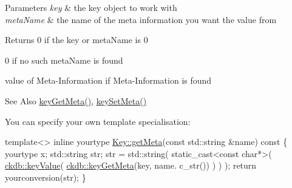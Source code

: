 \begin{DoxyParams}{Parameters}
{\em key} & the key object to work with \\
\hline
{\em meta\-Name} & the name of the meta information you want the value from \\
\hline
\end{DoxyParams}
\begin{DoxyReturn}{Returns}
0 if the key or meta\-Name is 0 

0 if no such meta\-Name is found 

value of Meta-\/\-Information if Meta-\/\-Information is found 
\end{DoxyReturn}
\begin{DoxySeeAlso}{See Also}
\hyperlink{group__keymeta_ga9ed3875495ddb3d8a8d29158a60a147c}{key\-Get\-Meta()}, \hyperlink{group__keymeta_gae1f15546b234ffb6007d8a31178652b9}{key\-Set\-Meta()} 
\end{DoxySeeAlso}


You can specify your own template specialisation\-: 
\begin{DoxyCode}
\textcolor{keyword}{template}<>
\textcolor{keyword}{inline} yourtype \hyperlink{classkdb_1_1Key_a7a4952f9ee22e6787fc9d43507114612}{Key::getMeta}(\textcolor{keyword}{const} std::string &name)\textcolor{keyword}{ const}
\textcolor{keyword}{}\{
        yourtype x;
        std::string str;
        str = std::string(
                static\_cast<const char*>(
                        \hyperlink{group__keyvalue_ga6f29609c5da53c6dc26a98678d5752af}{ckdb::keyValue}(
                                \hyperlink{group__keymeta_ga9ed3875495ddb3d8a8d29158a60a147c}{ckdb::keyGetMeta}(key, name.
      c\_str())
                                )
                        )
                );
        \textcolor{keywordflow}{return} yourconversion(str);
\}
\end{DoxyCode}



